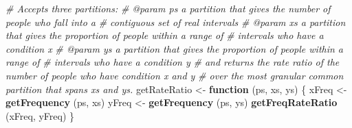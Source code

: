 \documentclass[]{article}
\newenvironment{Shaded}{}{}
\newcommand{\CommentTok}[1]{\textcolor[rgb]{0.38,0.63,0.69}{\textit{#1}}}
\newcommand{\ControlFlowTok}[1]{\textcolor[rgb]{0.00,0.44,0.13}{\textbf{#1}}}
\newcommand{\KeywordTok}[1]{\textcolor[rgb]{0.00,0.44,0.13}{\textbf{#1}}}
\newcommand{\NormalTok}[1]{#1}
\newcommand{\StringTok}[1]{\textcolor[rgb]{0.25,0.44,0.63}{#1}}
\begin{document}
\begin{Shaded}
\begin{Highlighting}[]
\CommentTok{# Accepts three partitions:}
\CommentTok{# @param ps a partition that gives the number of people who fall into a}
\CommentTok{#   contiguous set of real intervals}
\CommentTok{# @param xs a partition that gives the proportion of people within a range of}
\CommentTok{#   intervals who have a condition x}
\CommentTok{# @param ys a partition that gives the proportion of people within a range of}
\CommentTok{#   intervals who have a condition y}
\CommentTok{# and returns the rate ratio of the number of people who have condition x and y}
\CommentTok{# over the most granular common partition that spans xs and ys.}
\NormalTok{getRateRatio <-}\StringTok{ }\ControlFlowTok{function}\NormalTok{ (ps, xs, ys) \{}
\NormalTok{  xFreq <-}\StringTok{ }\KeywordTok{getFrequency}\NormalTok{ (ps, xs)}
\NormalTok{  yFreq <-}\StringTok{ }\KeywordTok{getFrequency}\NormalTok{ (ps, ys)}
  \KeywordTok{getFreqRateRatio}\NormalTok{ (xFreq, yFreq)}
\NormalTok{\}}


\end{Highlighting}
\end{Shaded}
\end{document}
